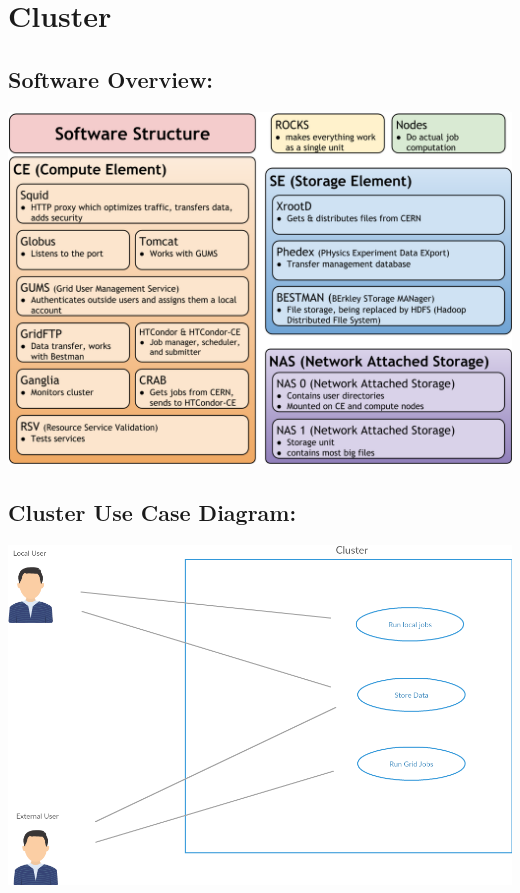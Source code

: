 \documentclass[12pt]{article}
\begin{document}
\section*{Cluster}
%

\subsection*{Software Overview:}
%
\includegraphics[scale=.4]{ClusterStructure.png}
\newline
\subsection*{Cluster Use Case Diagram:}
%
\includegraphics[scale=.67]{Cluster.png}

\end{document}
